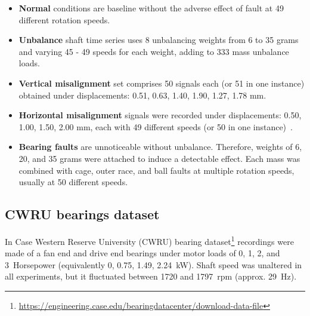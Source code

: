 \begin{itemize}
\itemsep0pt

\item \textbf{Normal} conditions are baseline without the adverse effect of fault at 49 different rotation speeds. 

\item \textbf{Unbalance} shaft time series uses 8 unbalancing weights from 6 to 35 grams and varying 45 - 49 speeds for each weight, adding to 333 mass unbalance loads. 

\item \textbf{Vertical misalignment} set comprises 50 signals each (or 51 in one instance) obtained under displacements: 0.51, 0.63, 1.40, 1.90, 1.27, 1.78 mm.

\item \textbf{Horizontal misalignment} signals were recorded under displacements: 0.50, 1.00, 1.50, 2.00 mm, each with 49 different speeds (or 50 in one instance)~\cite{pestana-viana_influence_2016}.

\item \textbf{Bearing faults} are unnoticeable without unbalance. Therefore, weights of 6, 20, and 35 grams were attached to induce a detectable effect. Each mass was combined with cage, outer race, and ball faults at multiple rotation speeds, usually at 50 different speeds.
\end{itemize}


\subsection{CWRU bearings dataset}
In Case Western Reserve University (CWRU) bearing dataset\footnote{\url{https://engineering.case.edu/bearingdatacenter/download-data-file}} recordings were made of a fan end and drive end bearings under motor loads of 0, 1, 2, and 3~Horsepower (equivalently 0, 0.75, 1.49, 2.24~kW). Shaft speed was unaltered in all experiments, but it fluctuated between 1720 and 1797~rpm (approx. 29~Hz).


